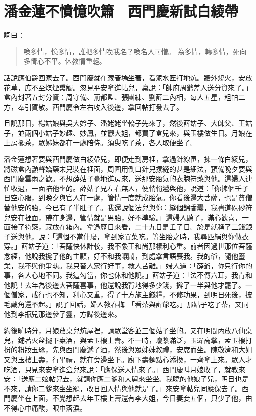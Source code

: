
\chapter{潘金蓮不憤憶吹簫　西門慶新試白綾帶}

詞曰：
\begin{quote}
喚多情，憶多情，誰把多情喚我名？喚名人可憎。
為多情，轉多情，死向多情心不平。休教情重輕。
\end{quote}

話說應伯爵回家去了。西門慶就在藏春塢坐著，看泥水匠打地炕。牆外燒火，安放花草，庶不至煤煙熏觸。忽見平安拿進帖兒，稟說：「帥府周爺差人送分資來了。」盒內封著五封分資：周守備、荊都監、張團練、劉薛二內相，每人五星，粗帕二方，奉引賀敬。西門慶令左右收入後邊，拿回帖打發去了。

且說那日，楊姑娘與吳大妗子、潘姥姥坐轎子先來了，然後薛姑子、大師父、王姑子，並兩個小姑子妙趣、妙鳳，並鬱大姐，都買了盒兒來，與玉樓做生日。月娘在上房擺茶，眾姊妹都在一處陪侍。須臾吃了茶，各人取便坐了。

潘金蓮想著要與西門慶做白綾帶兒，即便走到房裡，拿過針線匣，揀一條白綾兒，將磁盒內顫聲嬌藥末兒裝在裡面，周圍用倒口針兒撩縫的甚是細法，預備晚夕要與西門慶雲雨之歡。不想薛姑子驀地進房來，送那安胎氣的衣胞符藥與他。這婦人連忙收過，一面陪他坐的。薛姑子見左右無人，便悄悄遞與他，說道：「你揀個壬子日空心服，到晚夕與官人在一處，管情一度就成胎氣。你看後邊大菩薩，也是貧僧替他安的胎，今已有了半肚子了。我還說個法兒與你：縫個錦香囊，我書道硃砂符兒安在裡面，帶在身邊，管情就是男胎，好不準驗。」這婦人聽了，滿心歡喜，一面接了符藥，藏放在箱內。拿過歷日來看，二十九日是壬子日。於是就稱了三錢銀子送與他，說：「這個不當什麼，拿到家買菜吃。等坐胎之時，我尋匹絹與你做衣穿。」薛姑子道：「菩薩快休計較，我不象王和尚那樣利心重。前者因過世那位菩薩念經，他說我攙了他的主顧，好不和我嚷鬧，到處拿言語喪我。我的爺，隨他墮業，我不與他爭執。我只替人家行好事，救人苦難。」婦人道：「薛爺，你只行你的事，各人心地不同。我這勾當，你也休和他說。」薛姑子道：「法不傳六耳，我肯和他說！去年為後邊大菩薩喜事，他還說我背地得多少錢，擗了一半與他才罷了。一個僧家，戒行也不知，利心又重，得了十方施主錢糧，不修功果，到明日死後，披毛戴角還不起。」說了回話，婦人教春梅：「看茶與薛爺吃。」那姑子吃了茶，又同他到李瓶兒那邊參了靈，方歸後邊來。

約後晌時分，月娘放桌兒炕屋裡，請眾堂客並三個姑子坐的。又在明間內放八仙桌兒，鋪著火盆擺下案酒，與孟玉樓上壽。不一時，瓊漿滿泛，玉斝高擎，孟玉樓打扮的粉妝玉琢，先與西門慶遞了酒，然後與眾姊妹敘禮，安席而坐。陳敬濟和大姐又與玉樓上壽，行畢禮，就在旁邊坐下。廚下壽麵點心添換，一齊拿上來。眾人才吃酒，只見來安拿進盒兒來說：「應保送人情來了。」西門慶叫月娘收了，就教來安：「送應二娘帖兒去，就請你應二爹和大舅來坐坐。我曉的他娘子兒，明日也是不來，請你二爹來坐坐罷，改日回人情與他就是了。」來安拿帖兒同應保去了。西門慶坐在上面，不覺想起去年玉樓上壽還有李大姐，今日妻妾五個，只少了他，由不得心中痛酸，眼中落淚。

